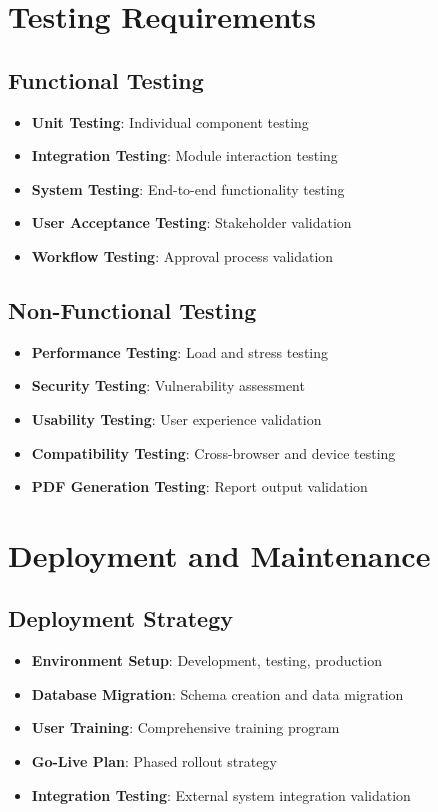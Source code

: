 \documentclass[12pt,a4paper]{article}
\begin{document}
\section{Testing Requirements}

\subsection{Functional Testing}
\begin{itemize}
    \item \textbf{Unit Testing}: Individual component testing
    \item \textbf{Integration Testing}: Module interaction testing
    \item \textbf{System Testing}: End-to-end functionality testing
    \item \textbf{User Acceptance Testing}: Stakeholder validation
    \item \textbf{Workflow Testing}: Approval process validation
\end{itemize}

\subsection{Non-Functional Testing}
\begin{itemize}
    \item \textbf{Performance Testing}: Load and stress testing
    \item \textbf{Security Testing}: Vulnerability assessment
    \item \textbf{Usability Testing}: User experience validation
    \item \textbf{Compatibility Testing}: Cross-browser and device testing
    \item \textbf{PDF Generation Testing}: Report output validation
\end{itemize}

\section{Deployment and Maintenance}

\subsection{Deployment Strategy}
\begin{itemize}
    \item \textbf{Environment Setup}: Development, testing, production
    \item \textbf{Database Migration}: Schema creation and data migration
    \item \textbf{User Training}: Comprehensive training program
    \item \textbf{Go-Live Plan}: Phased rollout strategy
    \item \textbf{Integration Testing}: External system integration validation
\end{itemize}
\end{document}
